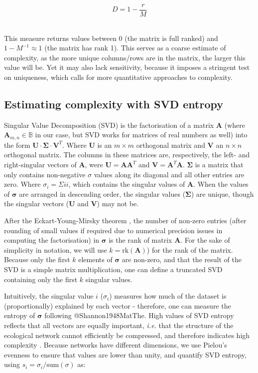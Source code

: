 \[D = 1-\frac{r}{M}\]\

This measure returns values between 0 (the matrix is full ranked) and \(1-M^{-1}
\approx 1\) (the matrix has rank 1). This serves as a coarse estimate of
complexity, as the more unique columns/rows are in the matrix, the larger this
value will be. Yet it may also lack sensitivity, because it imposes a stringent
test on uniqueness, which calls for more quantitative approaches to complexity.

\subsection{Estimating complexity with SVD
entropy}\label{estimating-complexity-with-svd-entropy}

Singular Value Decomposition (SVD) is the factorisation of a matrix
\(\mathbf{A}\) (where \(\mathbf{A}_{m,n} \in\mathbb{B}\) in our case, but SVD
works for matrices of real numbers as well) into the form
\(\mathbf{U}\cdot\mathbf{\Sigma}\cdot \mathbf{V}^T\). Where \(\mathbf{U}\) is an
\(m \times m\) orthogonal matrix and \(\mathbf{V}\) an \(n \times n\) orthogonal
matrix. The columns in these matrices are, respectively, the left- and
right-singular vectors of \(\mathbf{A}\), were \(\mathbf{U} =
\mathbf{A}\mathbf{A}^T\) and \(\mathbf{V} = \mathbf{A}^T\mathbf{A}\).
\(\mathbf{\Sigma}\) is a matrix that only contains non-negative \(\sigma\)
values along its diagonal and all other entries are zero. Where \(\sigma_{i} =
\Sigma{ii}\), which contains the singular values of \(\mathbf{A}\). When the
values of \(\mathbf{\sigma}\) are arranged in descending order, the singular
values (\(\mathbf{\Sigma}\)) are unique, though the singular vectors
(\(\mathbf{U}\) and \(\mathbf{V}\)) may not be.

After the Eckart-Young-Mirsky theorem \cite{Eckart1936AppOne, Golub1987GenEck},
the number of non-zero entries (after rounding of small values if required due
to numerical precision issues in computing the factorisation) in
\(\mathbf{\sigma}\) is the rank of matrix \(\mathbf{A}\). For the sake of
simplicity in notation, we will use \(k = \text{rk}(\mathbf{A})\)) for the rank
of the matrix. Because only the first \(k\) elements of \(\mathbf{\sigma}\) are
non-zero, and that the result of the SVD is a simple matrix multiplication, one
can define a truncated SVD containing only the first \(k\) singular values.

Intuitively, the singular value \(i\) (\(\sigma_i\)) measures how much of the
dataset is (proportionally) explained by each vector - therefore, one can
measure the entropy of \(\mathbf{\sigma}\) following @Shannon1948MatThe. High
values of SVD entropy reflects that all vectors are equally important,
\emph{i.e.} that the structure of the ecological network cannot efficiently be
compressed, and therefore indicates high complexity \cite{Gu2016HowLon}. Because
networks have different dimensions, we use Pielou's evenness
\cite{Pielou1975EcoDiv} to ensure that values are lower than unity, and quantify
SVD entropy, using \(s_i = \sigma_i/\text{sum}(\sigma)\) as:

